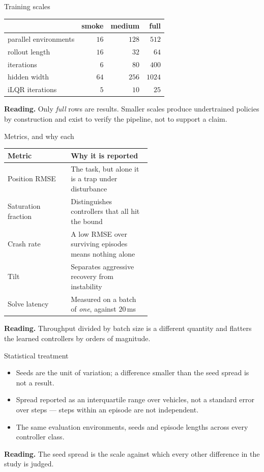 \documentclass[10pt]{beamer}
\newcommand{\takeaway}[1]{\par\vfill{\footnotesize\textbf{Reading.} #1\par}}
\begin{document}
\begin{frame}{Training scales}
  \begin{table}
    \centering
    \small
    \begin{tabular}{lrrr}
      \toprule
      & smoke & medium & full \\
      \midrule
      parallel environments & $16$ & $128$ & $512$ \\
      rollout length        & $16$ & $32$  & $64$ \\
      iterations            & $6$  & $80$  & $400$ \\
      hidden width          & $64$ & $256$ & $1024$ \\
      iLQR iterations       & $5$  & $10$  & $25$ \\
      \bottomrule
    \end{tabular}
  \end{table}
  \takeaway{Only \emph{full} rows are results. Smaller scales produce
    undertrained policies by construction and exist to verify the pipeline,
    not to support a claim.}
\end{frame}

\begin{frame}{Metrics, and why each}
  \begin{table}
    \centering
    \small
    \begin{tabular}{lp{0.56\linewidth}}
      \toprule
      Metric & Why it is reported \\
      \midrule
      Position RMSE & The task, but alone it is a trap under disturbance \\
      Saturation fraction & Distinguishes controllers that all hit the bound \\
      Crash rate & A low RMSE over surviving episodes means nothing alone \\
      Tilt & Separates aggressive recovery from instability \\
      Solve latency & Measured on a batch of \emph{one}, against $20\,$ms \\
      \bottomrule
    \end{tabular}
  \end{table}
  \takeaway{Throughput divided by batch size is a different quantity and
    flatters the learned controllers by orders of magnitude.}
\end{frame}

\begin{frame}{Statistical treatment}
  \begin{itemize}
    \item Seeds are the unit of variation; a difference smaller than the seed
      spread is not a result.
    \item Spread reported as an interquartile range over vehicles, not a
      standard error over steps --- steps within an episode are not
      independent.
    \item The same evaluation environments, seeds and episode lengths across
      every controller class.
  \end{itemize}
  \takeaway{The seed spread is the scale against which every other difference
    in the study is judged.}
\end{frame}
\end{document}
